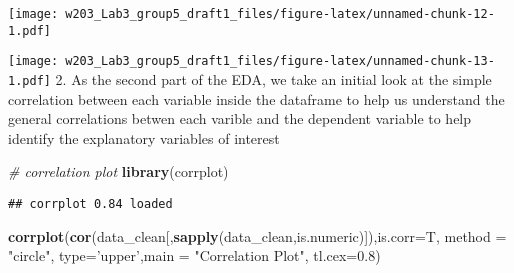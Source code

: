 \documentclass[]{article}
\newenvironment{Shaded}{\begin{snugshade}}{\end{snugshade}}
\newcommand{\KeywordTok}[1]{\textcolor[rgb]{0.13,0.29,0.53}{\textbf{#1}}}
\newcommand{\DataTypeTok}[1]{\textcolor[rgb]{0.13,0.29,0.53}{#1}}
\newcommand{\DecValTok}[1]{\textcolor[rgb]{0.00,0.00,0.81}{#1}}
\newcommand{\FloatTok}[1]{\textcolor[rgb]{0.00,0.00,0.81}{#1}}
\newcommand{\StringTok}[1]{\textcolor[rgb]{0.31,0.60,0.02}{#1}}
\newcommand{\CommentTok}[1]{\textcolor[rgb]{0.56,0.35,0.01}{\textit{#1}}}
\newcommand{\OperatorTok}[1]{\textcolor[rgb]{0.81,0.36,0.00}{\textbf{#1}}}
\newcommand{\NormalTok}[1]{#1}
\begin{document}
\begin{Shaded}
\end{Shaded}

\texttt{[image: w203\_Lab3\_group5\_draft1\_files/figure-latex/unnamed-chunk-12-1.pdf]}

\begin{Shaded}
\end{Shaded}

\texttt{[image: w203\_Lab3\_group5\_draft1\_files/figure-latex/unnamed-chunk-13-1.pdf]}
2. As the second part of the EDA, we take an initial look at the simple
correlation between each variable inside the dataframe to help us
understand the general correlations betwen each varible and the
dependent variable to help identify the explanatory variables of
interest

\begin{Shaded}
\begin{Highlighting}[]
\CommentTok{# correlation plot}
\KeywordTok{library}\NormalTok{(corrplot)}
\end{Highlighting}
\end{Shaded}

\begin{verbatim}
## corrplot 0.84 loaded
\end{verbatim}

\begin{Shaded}
\begin{Highlighting}[]
\KeywordTok{corrplot}\NormalTok{(}\KeywordTok{cor}\NormalTok{(data_clean[,}\KeywordTok{sapply}\NormalTok{(data_clean,is.numeric)]),}\DataTypeTok{is.corr=}\NormalTok{T, }\DataTypeTok{method =} \StringTok{"circle"}\NormalTok{, }\DataTypeTok{type=}\StringTok{'upper'}\NormalTok{,}\DataTypeTok{main =} \StringTok{"Correlation Plot"}\NormalTok{, }\DataTypeTok{tl.cex=}\FloatTok{0.8}\NormalTok{)}
\end{Highlighting}
\end{Shaded}
\end{document}
